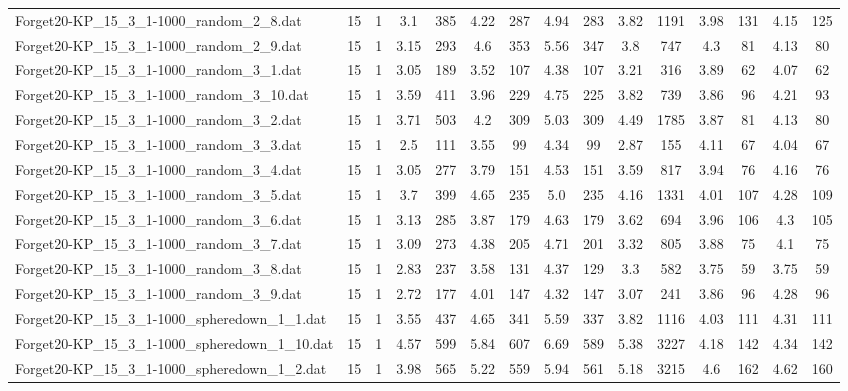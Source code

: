 \begin{table}[!ht]
{\begin{tabular}{lcccccccccccccc}
Forget20-KP\_15\_3\_1-1000\_random\_2\_8.dat & 15 & 1 & 3.1 & 385 & 4.22 & 287 & 4.94 & 283 & 3.82 & 1191 & 3.98 & 131 & 4.15 & 125 \\
Forget20-KP\_15\_3\_1-1000\_random\_2\_9.dat & 15 & 1 & 3.15 & 293 & 4.6 & 353 & 5.56 & 347 & 3.8 & 747 & 4.3 & 81 & 4.13 & 80 \\
Forget20-KP\_15\_3\_1-1000\_random\_3\_1.dat & 15 & 1 & 3.05 & 189 & 3.52 & 107 & 4.38 & 107 & 3.21 & 316 & 3.89 & 62 & 4.07 & 62 \\
Forget20-KP\_15\_3\_1-1000\_random\_3\_10.dat & 15 & 1 & 3.59 & 411 & 3.96 & 229 & 4.75 & 225 & 3.82 & 739 & 3.86 & 96 & 4.21 & 93 \\
Forget20-KP\_15\_3\_1-1000\_random\_3\_2.dat & 15 & 1 & 3.71 & 503 & 4.2 & 309 & 5.03 & 309 & 4.49 & 1785 & 3.87 & 81 & 4.13 & 80 \\
Forget20-KP\_15\_3\_1-1000\_random\_3\_3.dat & 15 & 1 & 2.5 & 111 & 3.55 & 99 & 4.34 & 99 & 2.87 & 155 & 4.11 & 67 & 4.04 & 67 \\
Forget20-KP\_15\_3\_1-1000\_random\_3\_4.dat & 15 & 1 & 3.05 & 277 & 3.79 & 151 & 4.53 & 151 & 3.59 & 817 & 3.94 & 76 & 4.16 & 76 \\
Forget20-KP\_15\_3\_1-1000\_random\_3\_5.dat & 15 & 1 & 3.7 & 399 & 4.65 & 235 & 5.0 & 235 & 4.16 & 1331 & 4.01 & 107 & 4.28 & 109 \\
Forget20-KP\_15\_3\_1-1000\_random\_3\_6.dat & 15 & 1 & 3.13 & 285 & 3.87 & 179 & 4.63 & 179 & 3.62 & 694 & 3.96 & 106 & 4.3 & 105 \\
Forget20-KP\_15\_3\_1-1000\_random\_3\_7.dat & 15 & 1 & 3.09 & 273 & 4.38 & 205 & 4.71 & 201 & 3.32 & 805 & 3.88 & 75 & 4.1 & 75 \\
Forget20-KP\_15\_3\_1-1000\_random\_3\_8.dat & 15 & 1 & 2.83 & 237 & 3.58 & 131 & 4.37 & 129 & 3.3 & 582 & 3.75 & 59 & 3.75 & 59 \\
Forget20-KP\_15\_3\_1-1000\_random\_3\_9.dat & 15 & 1 & 2.72 & 177 & 4.01 & 147 & 4.32 & 147 & 3.07 & 241 & 3.86 & 96 & 4.28 & 96 \\
Forget20-KP\_15\_3\_1-1000\_spheredown\_1\_1.dat & 15 & 1 & 3.55 & 437 & 4.65 & 341 & 5.59 & 337 & 3.82 & 1116 & 4.03 & 111 & 4.31 & 111 \\
Forget20-KP\_15\_3\_1-1000\_spheredown\_1\_10.dat & 15 & 1 & 4.57 & 599 & 5.84 & 607 & 6.69 & 589 & 5.38 & 3227 & 4.18 & 142 & 4.34 & 142 \\
Forget20-KP\_15\_3\_1-1000\_spheredown\_1\_2.dat & 15 & 1 & 3.98 & 565 & 5.22 & 559 & 5.94 & 561 & 5.18 & 3215 & 4.6 & 162 & 4.62 & 160 \\

\end{tabular}}
\end{table}
